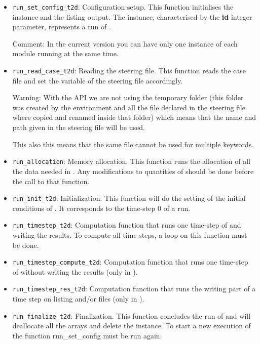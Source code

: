 \begin{itemize}
\item \verb!run_set_config_t2d!: Configuration setup. This function initialises
  the instance and the listing output. The instance, characterised by the
  \textbf{id} integer parameter, represents a run of .

\begin{CommentBlock}{Comment:}
\centering
  In the current version you can have only one instance of each module running
  at the same time.
\end{CommentBlock}

\item \verb!run_read_case_t2d!: Reading the  steering file. This
  function reads the case file and set the variable of the 
    steering file accordingly.

\begin{WarningBlock}{Warning:}
\centering
With the API we are not using the temporary folder (this folder was created by
  the \python{} environment and all the file declared in the steering file where
  copied and renamed inside that folder) which means that the name and path
  given in the steering file will be used.

This also this means that the same file cannot be used for multiple keywords.
\end{WarningBlock}

\item \verb!run_allocation!: Memory allocation. This function runs the
  allocation of all the data needed in . Any modifications to
    quantities of  should be done before the call to that function.

\item \verb!run_init_t2d!: Initialization. This function will do the setting of
  the initial conditions of . It corresponds to the time-step 0 of
    a  run.

\item \verb!run_timestep_t2d!: Computation function that runs one time-step
  of  and writing the results. To compute all time steps, a
    loop on this function must be done.

\item \verb!run_timestep_compute_t2d!: Computation function that runs one time-step
  of  without writing the results (only in ).

\item \verb!run_timestep_res_t2d!: Computation function that runs the writing
  part of a time step on listing and/or files (only in ).

\item \verb!run_finalize_t2d!: Finalization. This function concludes the run of
   and will deallocate all the arrays and delete the instance. To
    start a new execution of  the function run\_set\_config must be
    run again.

\end{itemize}

